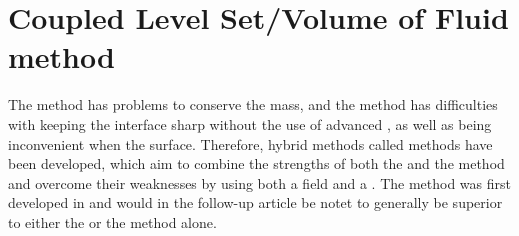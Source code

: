 



\section{Coupled Level Set/Volume of Fluid method}

The \LS method has problems to conserve the mass, and the \VOF method has difficulties with keeping the interface sharp without the use of advanced , as well as being inconvenient when \visualizing the surface. Therefore, hybrid methods called \CLSVOF methods have been developed, which aim to combine the strengths of both the \LS and the \VOF method and overcome their weaknesses by using both a  field and a . The \CLSVOF method was first developed in \citep{Puckett1998} and would in the follow-up article \citep{Sussman2000} be notet to generally be superior to either the \LS or the \VOF method alone.